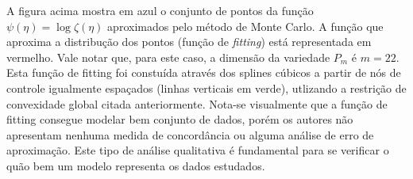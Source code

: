 \documentclass[a4paper,titlepage]{article}
\begin{document}
\begin{center}
  \vspace{1em}
  \vspace{1em}
\end{center}

A figura acima mostra em azul o conjunto de pontos da função
$\psi(\eta) = \log \zeta(\eta)$ aproximados pelo método de Monte Carlo.
A função que aproxima a distribução dos pontos (função de \textit{fitting})
está representada em vermelho. Vale notar que, para este caso, a dimensão da
variedade $P_m$ é $m=22$. Esta função de fitting foi constuída através dos
splines cúbicos a partir de nós de controle igualmente espaçados (linhas
verticais em verde), utlizando a restrição de convexidade global citada
anteriormente. Nota-se visualmente que a função de fitting consegue modelar
bem conjunto de dados, porém os autores não apresentam nenhuma medida de
concordância ou alguma análise de erro de aproximação. Este tipo de análise
qualitativa é fundamental para se verificar o quão bem um modelo representa
os dados estudados.
\end{document}
